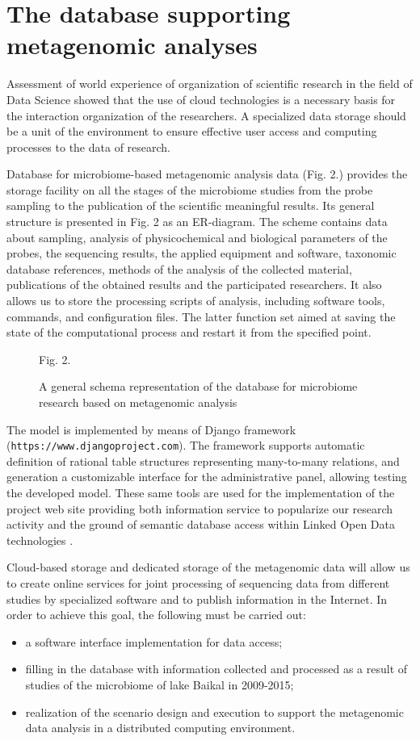 \documentclass[conference,a4paper]{IEEEtran}
\providecommand\url[1]{\texttt{#1}}
\begin{document}
\section{The database supporting metagenomic analyses}
\label{sec:dbsupp}

Assessment of world experience of organization of scientific research in the field of Data Science showed that the use of cloud technologies is a necessary basis for the interaction organization of the researchers. A specialized data storage should be a unit of the environment to ensure effective user access and computing processes to the data of research.

Database for microbiome-based metagenomic analysis data (Fig. 2.) provides the storage facility on all the stages of the microbiome studies from the probe sampling to the publication of the scientific meaningful results.  Its general structure is presented in Fig. 2 as an ER-diagram.  The scheme contains data about sampling, analysis of physicochemical and biological parameters of the probes, the sequencing results, the applied equipment and software, taxonomic database references, methods of the analysis of the collected material, publications of the obtained results and the participated researchers.  It also allows us to store the processing scripts of analysis, including software tools, commands, and configuration files.  The latter function set aimed at saving the state of the computational process and restart it from the specified point.

\begin{figure}[t]\centering
Fig. 2. \caption{A general schema representation of the database for microbiome research based on metagenomic analysis}
\end{figure}

The model is implemented by means of Django framework (\url{https://www.djangoproject.com}).  The framework supports automatic definition of rational table structures representing many-to-many relations, and generation a customizable interface for the administrative panel, allowing testing the developed model.  These same tools are used for the implementation of the project web site providing both information service to popularize our research activity and the ground of semantic database access within Linked Open Data technologies \cite{LOD}.

Cloud-based storage and dedicated storage of the metagenomic data will allow us to create online services for joint processing of sequencing data from different studies by specialized software and to publish information in the Internet. In order to achieve this goal, the following must be carried out:
\begin{itemize}
\item a software interface implementation for data access;
\item filling in the database with information collected and processed as a result of studies of the microbiome of lake Baikal in 2009-2015;
\item realization of the scenario design and execution to support the metagenomic data analysis in a distributed computing environment.
\end{itemize}
\end{document}
